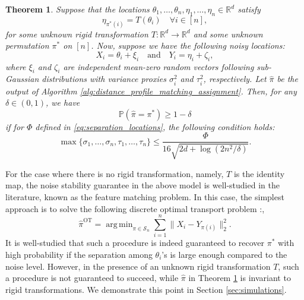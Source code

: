 \documentclass[11pt,letterpaper]{article}
\newtheorem{theorem}{Theorem} %
\theoremstyle{definition}
\numberwithin{equation}{section}
\newcommand{\cS}{\mathcal{S}}
\newcommand{\R}{\mathbb{R}}
\renewcommand{\P}{\mathbb{P}}
\DeclareMathOperator*{\argmin}{arg\,min} %
\begin{document}
\begin{theorem}
    \label{thm:noise_stability}
    Suppose that the locations $\theta_1, \ldots, \theta_n, \eta_1, \ldots, \eta_n \in \R^d$ satisfy
    \begin{equation}
        \label{eq:locations_eta}
        \eta_{\pi^\ast(i)} = T(\theta_i) \quad \forall i \in [n],
    \end{equation}
    for some unknown rigid transformation $T \colon \R^d \to \R^d$ and some unknown permutation $\pi^\ast$ on $[n]$. Now, suppose we have the following noisy locations:
    \begin{equation}
        \label{eq:noise_stability_X_Y}
        X_i = \theta_i + \xi_i \quad \text{and} \quad Y_i = \eta_i + \zeta_i,
    \end{equation}
    where $\xi_i$ and $\zeta_i$ are independent mean-zero random vectors following sub-Gaussian distributions with variance proxies $\sigma_i^2$ and $\tau_i^2$, respectively. Let $\hat{\pi}$ be the output of Algorithm \ref{alg:distance_profile_matching_assignment}. Then, for any $\delta \in (0, 1)$, we have
    \begin{equation*}
        \P(\hat{\pi} = \pi^\ast) \ge 1 - \delta
    \end{equation*}
    if for $\Phi$ defined in \eqref{eq:separation_locations}, the following condition holds:
    \begin{equation}
        \label{eq:noise_level_condition}        
        \max\{\sigma_1, \ldots, \sigma_n, \tau_1, \ldots, \tau_n\} \le \frac{\Phi}{16 \sqrt{2 d + \log(2 n^2 / \delta)}}.
    \end{equation}
\end{theorem}

For the case where there is no rigid transformation, namely, $T$ is the identity map, the noise stability guarantee in the above model is well-studied in the literature, known as the feature matching problem. In this case, the simplest approach is to solve the following discrete optimal transport problem \citep{peyre2019computational}:, 
\begin{equation}
    \label{eq:feature_matching_linear_assignment}
    \hat{\pi}^{\mathrm{OT}} = \argmin_{\pi \in \cS_n} \sum_{i = 1}^{n} \|X_i - Y_{\pi(i)}\|_2^2.
\end{equation} 
It is well-studied \citep{collier2016minimax,galstyan2022optimal} that such a procedure is indeed guaranteed to recover $\pi^\ast$ with high probability if the separation among $\theta_i$'s is large enough compared to the noise level. However, in the presence of an unknown rigid transformation $T$, such a procedure is not guaranteed to succeed, while $\hat{\pi}$ in Theorem \ref{thm:noise_stability} is invariant to rigid transformations. We demonstrate this point in Section \ref{sec:simulations}.
\end{document}
